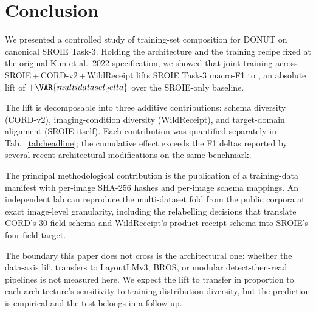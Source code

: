 \section{Conclusion}
\label{sec:conclusion}

We presented a controlled study of training-set composition for
DONUT on canonical SROIE Task-3.  Holding the architecture and the
training recipe fixed at the original Kim et al.\ 2022 specification,
we showed that joint training across SROIE\,+\,CORD-v2\,+\,WildReceipt
lifts SROIE Task-3 macro-F1 to , an absolute lift of
$+\VAR{multidataset_delta}$ over the SROIE-only baseline.

The lift is decomposable into three additive contributions: schema
diversity (CORD-v2), imaging-condition diversity (WildReceipt), and
target-domain alignment (SROIE itself).  Each contribution was
quantified separately in Tab.~\ref{tab:headline}; the cumulative
effect exceeds the F1 deltas reported by several recent
architectural modifications on the same benchmark.

The principal methodological contribution is the publication of a
training-data manifest with per-image SHA-256 hashes and per-image
schema mappings.  An independent lab can reproduce the multi-dataset
fold from the public corpora at exact image-level granularity,
including the relabelling decisions that translate CORD's 30-field
schema and WildReceipt's product-receipt schema into SROIE's
four-field target.

The boundary this paper does not cross is the architectural one:
whether the data-axis lift transfers to LayoutLMv3, BROS, or
modular detect-then-read pipelines is not measured here.  We expect
the lift to transfer in proportion to each architecture's
sensitivity to training-distribution diversity, but the prediction
is empirical and the test belongs in a follow-up.
